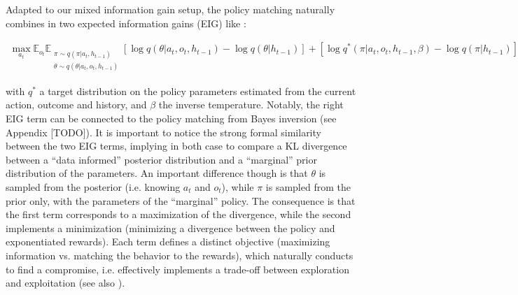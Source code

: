 \documentclass[10pt,letterpaper]{article}
\begin{document}
Adapted to our mixed information gain setup, the policy matching naturally combines in two expected information gains (EIG) like :
\begin{small}
\begin{align}\label{eq:BS-SAC}
\max_{a_t} \mathbb{E}_{o_t} \mathbb{E}_{\substack{\pi \sim q(\pi|a_t,h_{t-1})\\ \theta\sim q(\theta|a_t,o_t,h_{t-1})}} \left[\log q(\theta|a_t, o_t, h_{t-1}) - \log q(\theta|h_{t-1})\right] + \left[\log q^*(\pi|a_t, o_t, h_{t-1}, \beta) - \log q(\pi|h_{t-1})\right]
\end{align}
\end{small}
with $q^*$ a target distribution on the policy parameters estimated from the current action, outcome and history, and $\beta$ the inverse temperature. Notably, the right EIG term can be connected to the policy matching from Bayes inversion (see Appendix [TODO]). It is important to notice the strong formal similarity between the two EIG terms, implying in both case to compare a KL divergence between a ``data informed'' posterior distribution and a ``marginal'' prior distribution of the parameters. An important difference though is that $\theta$ is sampled from the posterior (i.e. knowing $a_t$ and $o_t$), while $\pi$ is sampled from the prior only, with the parameters of the ``marginal''  policy. The consequence is that the first term corresponds to a maximization of the divergence, while the second implements a minimization (minimizing a divergence between the policy and exponentiated rewards). Each term defines a distinct objective (maximizing information vs. matching the behavior to the rewards), which naturally conducts to find a compromise, i.e. effectively implements a trade-off between exploration and exploitation (see also \cite{dauce2022concurrent}).



\end{document}
